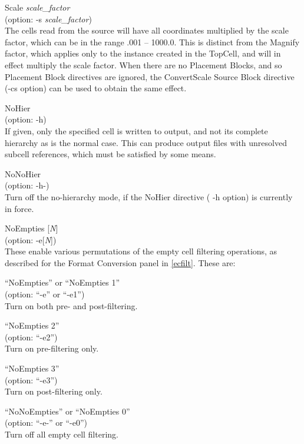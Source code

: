 \begin{description}
\item{\vt Scale} {\it scale\_factor}\\
(option: {\vt -s} {\it scale\_factor})\\
The cells read from the source will have all coordinates multiplied by
the scale factor, which can be in the range .001 -- 1000.0.  This is
distinct from the {\vt Magnify} factor, which applies only to the
instance created in the {\vt TopCell}, and will in effect multiply the
scale factor.  When there are no Placement Blocks, and so Placement
Block directives are ignored, the {\vt ConvertScale} Source Block
directive ({\vt -cs} option) can be used to obtain the same effect.

\item{\vt NoHier}\\
(option: {\vt -h})\\
If given, only the specified cell is written to output, and not its
complete hierarchy as is the normal case.  This can produce output
files with unresolved subcell references, which must be satisfied by
some means.

\item{\vt NoNoHier}\\
(option: {\vt -h-})\\
Turn off the no-hierarchy mode, if the {\vt NoHier} directive ({\vt
-h} option) is currently in force.

\item{\vt NoEmpties [{\it N\/}]}\\
(option: {\vt -e}[{\it N\/}])\\
These enable various permutations of the empty cell filtering
operations, as described for the
{\cb Format Conversion} panel in \ref{ecfilt}.  These are:

\begin{description}
\item{``{\vt NoEmpties}'' or ``{\vt NoEmpties 1}''\\
(option: ``{\vt -e}'' or ``{\vt -e1}'')}\\
Turn on both pre- and post-filtering.
\item{``{\vt NoEmpties 2}''\\
(option: ``{\vt -e2}'')}\\
Turn on pre-filtering only. 
\item{``{\vt NoEmpties 3}''\\
(option: ``{\vt -e3}'')}\\
Turn on post-filtering only.
\item{``{\vt NoNoEmpties}'' or ``{\vt NoEmpties 0}''\\
(option: ``{\vt -e-}'' or ``{\vt -e0}'')}\\
Turn off all empty cell filtering.
\end{description}


\end{description}

